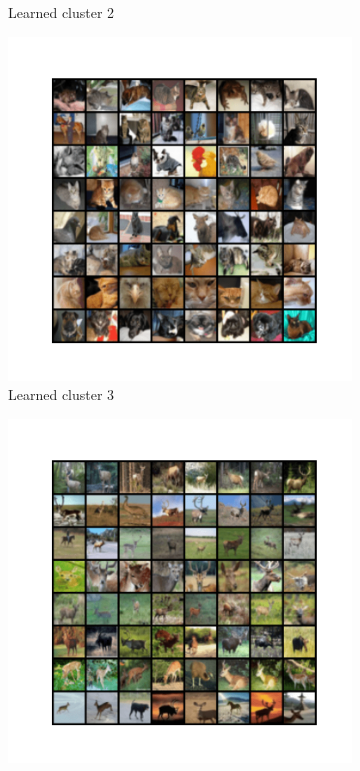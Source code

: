 \documentclass[10pt,twocolumn,letterpaper]{article}
\begin{document}
\begin{figure}
\begin{subfigure}{0.32\textwidth}
       \caption{Learned cluster 2}
       \label{fig:cifar10-2}
     \end{subfigure}
     \hfill
     \begin{subfigure}{0.32\textwidth}
       \includegraphics[width=\linewidth,trim={2cm 2cm 2cm 2cm},clip]{figures/experiments/cifar10_cluster/nearest_class2.png}
       \caption{Learned cluster 3}
       \label{fig:cifar10-3}
     \end{subfigure}
     \hfill
     \begin{subfigure}{0.32\textwidth}
       \includegraphics[width=\linewidth,trim={2cm 2cm 2cm 2cm},clip]{figures/experiments/cifar10_cluster/nearest_class3.png}

\end{subfigure}
\end{figure}
\end{document}
